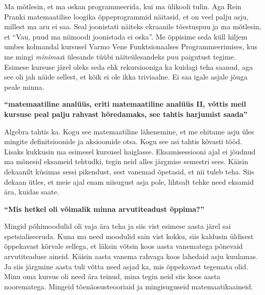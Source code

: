 Ma mõtlesin, et ma oskan programmeerida, kui ma ülikooli tulin. Aga Rein Pranki matemaatilise loogika õppeprogrammid näitasid, et on veel palju asju, millest ma aru ei saa. Seal joonistati näiteks ekraanile tõestuspuu ja ma mõtlesin, et \enquote{Vau, puud ma niimoodi joonistada ei oska}. Me õppisime seda küll hiljem umbes kolmandal kursusel Varmo Vene Funktsionaalses Programmeerimises, kus me mingi \emph{minimax}i ülesande tüübi näiteülesandeks puu paigutust tegime. Esimese kursuse järel oleks seda ehk rekursiooniga ka kuidagi teha saanud, aga see oli jah näide sellest, et kõik ei ole ikka triviaalne. Ei saa igale asjale jõuga peale minna. 

\textbf{\enquote{matemaatiline analüüs, eriti matemaatiline analüüs II, võttis meil kursuse peal palju rahvast hõredamaks, see tahtis harjumist saada}}

Algebra tahtis ka. Kogu see matemaatiline lähenemine, et me ehitame asju üles mingite definitsioonide ja aksioomide otsa. Kogu see asi tahtis kõvasti tööd. Lisaks kukkusin ma esimesel kursusel haiglasse. Eksamisessiooni ajal ei jõudnud ma mõnesid eksameid tehtudki, tegin neid alles järgmise semestri sees. Käisin dekaanilt küsimas sessi pikendust, sest vanemad õpetasid, et nii tuleb teha. Siis dekaan ütles, et meie ajal enam niisugust asja pole, lihtsalt tehke need eksamid ära, kuidas saate. 

\textbf{\enquote{Mis hetkel oli võimalik minna arvutiteadust õppima?}} 

Mingid põhimoodulid oli vaja ära teha ja siis vist esimese aasta järel sai spetsialiseeruda. Kuna ma need moodulid sain vist kokku, siis kaldusin üldisest õppekavast kõrvale sellega, et läksin võtsin koos aasta vanematega põnevaid arvutiteaduse aineid. Käisin aasta vanema rahvaga koos lahedaid asju kuulamas. Ja siis järgmine aasta tuli võtta need asjad ka, mis õppekavast tegemata olid. Minu oma kursus oli need ära teinud, mina tegin neid siis koos aasta noorematega. Mingeid tõenäosusteooriaid ja mingisuguseid matemaatikaaineid. 

